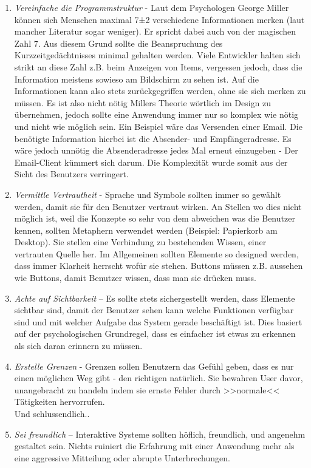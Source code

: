 \begin{small}
\begin{enumerate}
	\item \emph{Vereinfache die Programmstruktur} - Laut dem Psychologen George Miller können sich	Menschen maximal 7±2 verschiedene Informationen merken (laut mancher Literatur sogar weniger). Er spricht dabei auch von der magischen Zahl 7. Aus diesem Grund sollte die Beanspruchung des Kurzzeitgedächtnisses minimal gehalten werden. Viele Entwickler halten sich strikt an diese Zahl z.B. beim Anzeigen von Items, vergessen jedoch, dass die Information meistens sowieso am Bildschirm zu sehen ist. Auf die Informationen kann also stets zurückgegriffen werden, ohne sie sich merken zu müssen. Es ist also nicht nötig Millers Theorie wörtlich im Design zu übernehmen, jedoch sollte eine Anwendung immer nur so komplex wie nötig und nicht wie möglich sein. Ein Beispiel wäre das Versenden einer Email. Die benötigte Information hierbei ist die Absender- und Empfängeradresse. Es wäre jedoch unnötig die Absenderadresse jedes Mal erneut einzugeben - Der Email-Client kümmert sich darum. Die Komplexität wurde somit aus der Sicht des Benutzers verringert.
	\item \emph{Vermittle Vertrautheit} - Sprache und Symbole sollten immer so gewählt werden, damit sie für den Benutzer vertraut wirken. An Stellen wo dies nicht möglich ist, weil die	Konzepte so sehr von dem abweichen was die Benutzer kennen, sollten Metaphern verwendet werden (Beispiel: Papierkorb am Desktop). Sie stellen eine Verbindung zu bestehenden Wissen, einer vertrauten Quelle her. Im Allgemeinen sollten Elemente so	designed werden, dass immer Klarheit herrscht wofür sie stehen. Buttons müssen z.B.	aussehen wie Buttons, damit Benutzer wissen, dass man sie drücken muss.
	\item \emph{Achte auf Sichtbarkeit} – Es sollte stets sichergestellt werden, dass Elemente sichtbar sind, damit der Benutzer sehen kann welche Funktionen verfügbar sind und mit welcher Aufgabe das System gerade beschäftigt ist. Dies basiert auf der psychologischen Grundregel, dass es einfacher ist etwas zu erkennen als sich daran erinnern zu müssen.
	\item \emph{Erstelle Grenzen} - Grenzen sollen Benutzern das Gefühl geben, dass es nur einen möglichen Weg gibt - den richtigen natürlich. Sie bewahren User davor, unangebracht zu handeln indem sie ernste Fehler durch >>normale<< Tätigkeiten hervorrufen.\\
	Und schlussendlich..
	\item \emph{Sei freundlich} – Interaktive Systeme sollten höflich, freundlich, und angenehm gestaltet sein. Nichts ruiniert die Erfahrung mit einer Anwendung mehr als eine aggressive Mitteilung oder abrupte Unterbrechungen.
\end{enumerate}
\end{small}
\citep{Benyon:2005, Preece:1994, Saffer:2007, Shneiderman:1998}


